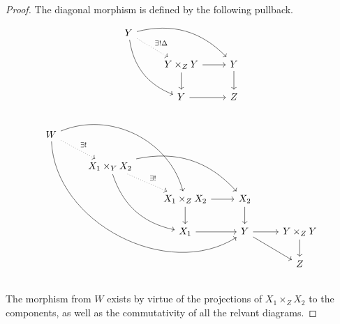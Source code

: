 \documentclass{article}
\begin{document}
\begin{proof}
    The diagonal morphism is defined by the following pullback.
    \[
        \begin{tikzcd}
            Y \ar[rdd, bend right] \ar[rrd, bend left] \ar[rd, "\exists!\Delta", dotted] &                            &          \\
                                                                                         & Y \times_Z Y \ar[d] \ar[r] & Y \ar[d] \\
                                                                                         & Y \ar[r]                   & Z
        \end{tikzcd}
    \] \[
        \begin{tikzcd}
            W \arrow[rrrddd, bend right=60] \arrow[rrdd, bend left=49] \arrow[rd, "\exists!", dotted] &                                                                                                &                                      &                        &                       \\
                                                                                                      & X_1 \times_Y X_2 \arrow[rdd, bend right] \arrow[rrd, bend left] \arrow[rd, "\exists!", dotted] &                                      &                        &                       \\
                                                                                                      &                                                                                                & X_1 \times_Z X_2 \arrow[r] \arrow[d] & X_2 \arrow[d]          &                       \\
                                                                                                      &                                                                                                & X_1 \arrow[r]                        & Y \arrow[rd] \arrow[r] & Y\times_Z Y \arrow[d] \\
                                                                                                      &                                                                                                &                                      &                        & Z
        \end{tikzcd}
    \]

    The morphism from $W$ exists by virtue of the projections of
    $X_1 \times_Z X_2$ to the components, as well as the commutativity of all
    the relvant diagrams.
\end{proof}
\end{document}
